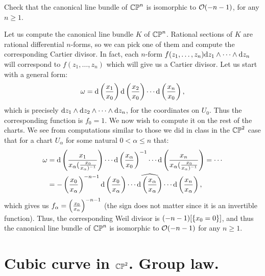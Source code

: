 \documentclass[11pt, a4paper]{article}
\begin{document}
\begin{exercise}
  Check that the canonical line bundle of $\mathbb{CP}^n$ is isomorphic
  to $\mathcal{O}(-n-1)$, for any $n \geq 1$.
\end{exercise}
\begin{solution}
  Let us compute the canonical line bundle $K$ of $\mathbb{CP}^n$.
  Rational sections of $K$ are rational differential $n$-forms,
  so we can pick one of them and compute the corresponding Cartier divisor.
  In fact, each $n$-form $f(z_1,\dots,z_n) \mathrm{d} z_1 \wedge \cdots \wedge \mathrm{d} z_n$
  will correspond to $f(z_1,\dots,z_n)$ which will give us a Cartier divisor.
  Let us start with a general form:
  \[
    \omega =
    \dif\del{\frac{x_1}{x_0}}
    \dif\del{\frac{x_2}{x_0}} \cdots
    \dif\del{\frac{x_n}{x_0}},
  \]
  which is precisely $\mathrm{d} z_1 \wedge \mathrm{d} z_2 \wedge \cdots \wedge \mathrm{d} z_n$,
  for the coordinates on $U_0$.
  Thus the corresponding function is $f_0 = 1$.
  We now wish to compute it on the rest of the charts.
  We see from computations similar to those we did in class
  in the $\mathbb{CP}^2$ case that for a chart $U_{\alpha}$
  for some natural $0 < \alpha \le n$ that:
  \begin{align*}
    \omega &=
    \dif\del{\frac{x_1}{x_{\alpha}(\frac{x_0}{x_{\alpha})^{-1}} }} \cdots
    \dif\del{\frac{x_\alpha}{x_0}}^{-1} \cdots
    \dif\del{\frac{x_n}{x_{\alpha}(\frac{x_0}{x_{\alpha})^{-1}} }} = \cdots \\ &=
    -\del{\frac{x_{0}}{x_{\alpha}}}^{-n-1} 
    \dif\del{\frac{x_0}{x_{\alpha}}} \cdots
    \widehat{\dif\del{\frac{x_{\alpha}}{x_{\alpha}}}} \cdots
    \dif\del{\frac{x_n}{x_{\alpha}}},
  \end{align*}
  which gives us $f_{\alpha} = \del{\frac{x_{0}}{x_{\alpha}}}^{-n-1}$
  (the sign does not matter since it is an invertible function).
  Thus, the corresponding Weil divisor is $(-n-1)[\left\{x_0 = 0\right\}]$,
  and thus the canonical line bundle of $\mathbb{CP}^n$ is isomorphic to $\mathcal{O}(-n-1)$
  for any $n \geq 1$.
\end{solution}

\newpage

\section{Cubic curve in \texorpdfstring{$\mathbb{CP}^2$}{CP}. Group law.}
\end{document}
